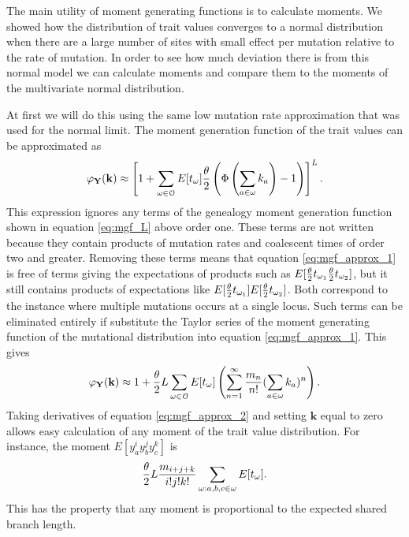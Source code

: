 The main utility of moment generating functions is to calculate moments. We
showed how the distribution of trait values converges to a normal distribution
when there are a large number of sites with small effect per mutation relative
to the rate of mutation. In order to see how much deviation there is from this
normal model we can calculate moments and compare them to the moments of the
multivariate normal distribution.

At first we will do this using the same low mutation rate approximation that was
used for the normal limit. The moment generation function of the trait values can 
be approximated as
\begin{equation}
  \label{eq:mgf_approx_1}
  \varphi_{\mathbf{Y}}(\mathbf{k}) \approx \left[ 1 + \sum_{\omega \in \mathcal{O}}
    E[t_\omega] \frac{\theta}{2} \left( \Phi\left( \sum_{a \in \omega} k_a\right) -1 \right) \right]^L.
\end{equation}
This expression ignores any terms of the genealogy moment generation function
shown in equation \ref{eq:mgf_L} above order one. These terms are not written
because they contain products of mutation rates and coalescent times of order
two and greater. Removing these terms means that equation \ref{eq:mgf_approx_1}
is free of terms giving the expectations of products such as $E[\frac{\theta}{2} t_{\omega_1}
  \frac{\theta}{2} t_{\omega_2}]$, but it still contains products of expectations like $E[\frac{\theta}{2}
  t_{\omega_1}]E[\frac{\theta}{2} t_{\omega_2}]$. Both correspond to the instance where
multiple mutations occurs at a single locus. Such terms can be eliminated
entirely if substitute the Taylor series of the moment generating function of
the mutational distribution into equation \ref{eq:mgf_approx_1}. This gives
\begin{equation}
  \label{eq:mgf_approx_2}
  \varphi_{\mathbf{Y}}(\mathbf{k}) \approx
  1 + \frac{\theta}{2} L \sum_{\omega \in \mathcal{O}} E[t_\omega]
  \left( \sum_{n=1}^\infty \frac{m_n}{n!} ( \sum_{a \in \omega}k_a)^n\right).
\end{equation}
Taking derivatives of equation \ref{eq:mgf_approx_2} and setting $\mathbf{k}$
equal to zero allows easy calculation of any moment of the trait value
distribution. For instance, the moment $E[y_a^i y_b^j y_c^k]$ is
\begin{equation}
  \frac{\theta}{2} L \frac{m_{i+j+k}}{i!j!k!} \sum_{\omega : a,b,c \in \omega} E[t_\omega].
\end{equation}
This has the property that any moment is proportional to the expected shared
branch length. 

